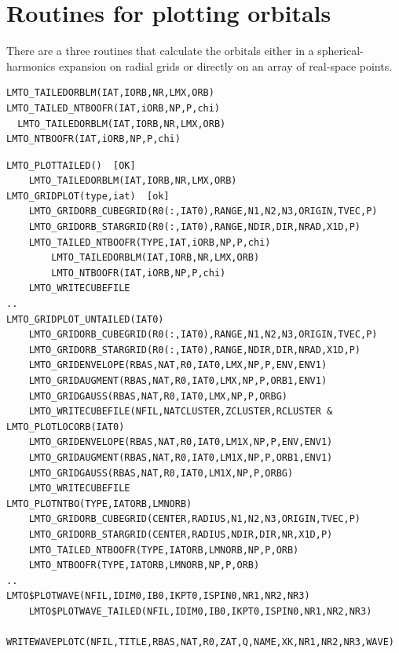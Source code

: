 \documentclass[11pt,a4paper]{report}
\begin{document}
\section{Routines for plotting orbitals}
There are a three routines that calculate the orbitals either in a
spherical-harmonics expansion on radial grids or directly on an array
of real-space points.
\begin{verbatim}
LMTO_TAILEDORBLM(IAT,IORB,NR,LMX,ORB)
LMTO_TAILED_NTBOOFR(IAT,iORB,NP,P,chi)
  LMTO_TAILEDORBLM(IAT,IORB,NR,LMX,ORB)
LMTO_NTBOOFR(IAT,iORB,NP,P,chi)
\end{verbatim}


\begin{verbatim}
LMTO_PLOTTAILED()  [OK]
    LMTO_TAILEDORBLM(IAT,IORB,NR,LMX,ORB)
LMTO_GRIDPLOT(type,iat)  [ok]
    LMTO_GRIDORB_CUBEGRID(R0(:,IAT0),RANGE,N1,N2,N3,ORIGIN,TVEC,P)
    LMTO_GRIDORB_STARGRID(R0(:,IAT0),RANGE,NDIR,DIR,NRAD,X1D,P)
    LMTO_TAILED_NTBOOFR(TYPE,IAT,iORB,NP,P,chi)
        LMTO_TAILEDORBLM(IAT,IORB,NR,LMX,ORB)
        LMTO_NTBOOFR(IAT,iORB,NP,P,chi)
    LMTO_WRITECUBEFILE
..
LMTO_GRIDPLOT_UNTAILED(IAT0)
    LMTO_GRIDORB_CUBEGRID(R0(:,IAT0),RANGE,N1,N2,N3,ORIGIN,TVEC,P)
    LMTO_GRIDORB_STARGRID(R0(:,IAT0),RANGE,NDIR,DIR,NRAD,X1D,P)
    LMTO_GRIDENVELOPE(RBAS,NAT,R0,IAT0,LMX,NP,P,ENV,ENV1)
    LMTO_GRIDAUGMENT(RBAS,NAT,R0,IAT0,LMX,NP,P,ORB1,ENV1)
    LMTO_GRIDGAUSS(RBAS,NAT,R0,IAT0,LMX,NP,P,ORBG)
    LMTO_WRITECUBEFILE(NFIL,NATCLUSTER,ZCLUSTER,RCLUSTER &
LMTO_PLOTLOCORB(IAT0)
    LMTO_GRIDENVELOPE(RBAS,NAT,R0,IAT0,LM1X,NP,P,ENV,ENV1)
    LMTO_GRIDAUGMENT(RBAS,NAT,R0,IAT0,LM1X,NP,P,ORB1,ENV1)
    LMTO_GRIDGAUSS(RBAS,NAT,R0,IAT0,LM1X,NP,P,ORBG)
    LMTO_WRITECUBEFILE
LMTO_PLOTNTBO(TYPE,IATORB,LMNORB)
    LMTO_GRIDORB_CUBEGRID(CENTER,RADIUS,N1,N2,N3,ORIGIN,TVEC,P)
    LMTO_GRIDORB_STARGRID(CENTER,RADIUS,NDIR,DIR,NR,X1D,P)
    LMTO_TAILED_NTBOOFR(TYPE,IATORB,LMNORB,NP,P,ORB)
    LMTO_NTBOOFR(TYPE,IATORB,LMNORB,NP,P,ORB)
..
LMTO$PLOTWAVE(NFIL,IDIM0,IB0,IKPT0,ISPIN0,NR1,NR2,NR3)
    LMTO$PLOTWAVE_TAILED(NFIL,IDIM0,IB0,IKPT0,ISPIN0,NR1,NR2,NR3)
        WRITEWAVEPLOTC(NFIL,TITLE,RBAS,NAT,R0,ZAT,Q,NAME,XK,NR1,NR2,NR3,WAVE)
\end{verbatim}
\end{document}
